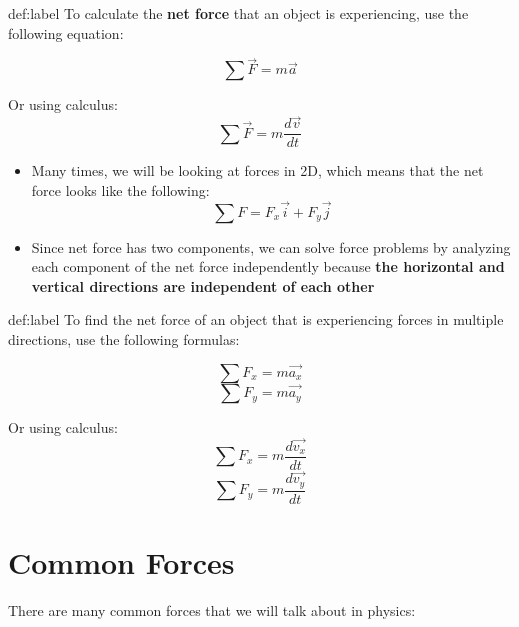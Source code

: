 \begin{definition}{def:label}
	To calculate the \textbf{net force} that an object is experiencing, use the following equation:

	$$
		\sum{\vec{F}} = m\vec{a}
	$$

	Or using calculus:
	$$
		\sum{\vec{F}} = m\frac{d\vec{v}}{{dt}}
	$$
\end{definition}

\begin{itemize}
	\item Many times, we will be looking at forces in 2D, which means that the net force looks like the following:
	$$
		\sum F = F_x \vec{i} + F_y \vec{j}
	$$
	\item Since net force has two components, we can solve force problems by analyzing each component of the net force independently because \textbf{the horizontal and vertical directions are independent of each other}
\end{itemize}

\begin{definition}{def:label}
	To find the net force of an object that is experiencing forces in multiple directions, use the following formulas:

	$$
		\sum F_x = m\vec{a_x}
	$$
	$$
		\sum F_y = m\vec{a_y}
	$$

	Or using calculus:
	$$
		\sum F_x = m\frac{d\vec{v_x}}{dt}
	$$
	$$
		\sum F_y = m\frac{d\vec{v_y}}{dt}
	$$
\end{definition}

\section{Common Forces}

There are many common forces that we will talk about in physics:

